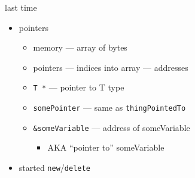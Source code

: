 \begin{comment}
\begin{frame}{last time}
    \begin{itemize}
    \item classes
        \begin{itemize}
        \item declarations in {\tt .h} file
        \item {\tt ClassName::method}
        \item {\tt class ... \{...\}\myemph{;}}
        \item {\tt const}, {\tt static}
        \end{itemize}
    \item objects --- values, not references
        \begin{itemize}
        \item {\tt return Foo(1)} --- {\tt Foo(1)} is temporary Foo object
        \item {\tt x = y} --- copy {\tt x} into {\tt y}
        \end{itemize}
    \item the preprocessor --- {\tt \#define}, {\tt \#include}, etc.
    \item started pointers
    \end{itemize}
\end{frame}
\end{comment}

\begin{frame}{last time}
    \begin{itemize}
    \item pointers
        \begin{itemize}
        \item memory --- array of bytes
        \item pointers --- indices into array --- addresses
        \item {\tt T *} --- pointer to T type
        \item {\tt *somePointer} --- same as {\tt thingPointedTo}
        \item {\tt &someVariable} --- address of someVariable
            \begin{itemize}
            \item AKA ``pointer to'' someVariable
            \end{itemize}
        \end{itemize}
    \item started {\tt new}/{\tt delete}
    \end{itemize}
\end{frame}
